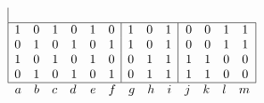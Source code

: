\begin{example}
\[\begin{array}{|@{}c@{}c@{}|@{}c@{}|}
\begin{array}{cccc}
		\end{array}\\\hline
		\begin{array}{cccc}
			1	&0	&1	&0\\
			0	&1	&0	&1\\
			1	&0	&1	&0\\
			0	&1	&0	&1\\
		\end{array}&\begin{array}{cc|ccc}
			1	&0	&1	&0	&1\\
			0	&1	&1	&0	&1\\
			1	&0	&0	&1	&1\\
			0	&1	&0	&1	&1\\
		\end{array}&\begin{array}{cccc}
			0	&0	&1	&1\\
			0	&0	&1	&1\\
			1	&1	&0	&0\\
			1	&1	&0	&0\\
		\end{array}\\\hline
		\multicolumn{1}{@{}c@{}}{\begin{array}{cccc}a&b&c&d\end{array}}
		&\multicolumn{1}{@{}c@{}}{\begin{array}{ccccc}e&f&g&h&i\end{array}}
		&\multicolumn{1}{@{}c@{}}{\begin{array}{cccc}j&k&l&m\end{array}}
	\end{array}
\]
\end{example}
